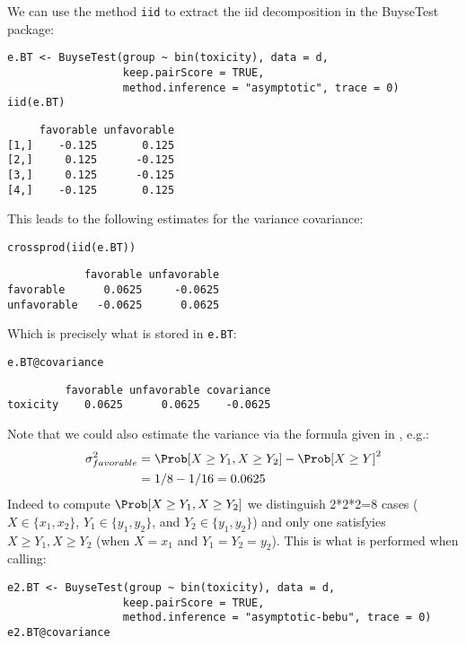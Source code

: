 \documentclass[12pt]{article}
\begin{document}
We can use the method \texttt{iid} to extract the iid decomposition in the
BuyseTest package:
\lstset{language=r,label= ,caption= ,captionpos=b,numbers=none}
\begin{lstlisting}
e.BT <- BuyseTest(group ~ bin(toxicity), data = d, 
				  keep.pairScore = TRUE,
				  method.inference = "asymptotic", trace = 0)
iid(e.BT)
\end{lstlisting}

\begin{verbatim}
     favorable unfavorable
[1,]    -0.125       0.125
[2,]     0.125      -0.125
[3,]     0.125      -0.125
[4,]    -0.125       0.125
\end{verbatim}

This leads to the following estimates for the variance covariance:
\lstset{language=r,label= ,caption= ,captionpos=b,numbers=none}
\begin{lstlisting}
crossprod(iid(e.BT))
\end{lstlisting}

\begin{verbatim}
            favorable unfavorable
favorable      0.0625     -0.0625
unfavorable   -0.0625      0.0625
\end{verbatim}

Which is precisely what is stored in \texttt{e.BT}:
\lstset{language=r,label= ,caption= ,captionpos=b,numbers=none}
\begin{lstlisting}
e.BT@covariance
\end{lstlisting}

\begin{verbatim}
         favorable unfavorable covariance
toxicity    0.0625      0.0625    -0.0625
\end{verbatim}

Note that we could also estimate the variance via the formula given in
\citep{bebu2015large}, e.g.:
\begin{align*}
\sigma^2_{favorable} &= \Prob[X \geq Y_1,X \geq Y_2] - \Prob[X \geq Y]^2 \\
&= 1/8 - 1/16 = 0.0625
\end{align*}
Indeed to compute \(\Prob[X \geq Y_1,X \geq Y_2]\) we distinguish
2*2*2=8 cases (\(X \in \{x_1,x_2\}\), \(Y_1 \in \{y_1,y_2\}\), and
\(Y_2 \in \{y_1,y_2\}\)) and only one satisfyies \(X \geq Y_1,X \geq
Y_2\) (when \(X=x_1\) and \(Y_1=Y_2=y_2\)). This is what is performed when calling:
\lstset{language=r,label= ,caption= ,captionpos=b,numbers=none}
\begin{lstlisting}
e2.BT <- BuyseTest(group ~ bin(toxicity), data = d, 
				  keep.pairScore = TRUE,
				  method.inference = "asymptotic-bebu", trace = 0)
e2.BT@covariance
\end{lstlisting}
\end{document}
